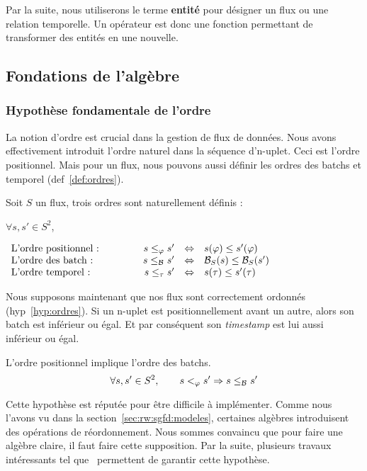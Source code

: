 Par la suite, nous utiliserons le terme \textbf{entité} pour désigner un flux ou une relation temporelle. Un opérateur est donc une fonction permettant de transformer des entités en une nouvelle.

\subsection{Fondations de l'algèbre}
\subsubsection{Hypothèse fondamentale de l'ordre}
La notion d'ordre est crucial dans la gestion de flux de données. Nous avons effectivement introduit l'ordre naturel dans la séquence d'n-uplet. Ceci est l'ordre positionnel. Mais pour un flux, nous pouvons aussi définir les ordres des batchs et temporel (def~\ref{def:ordres}).
\begin{defi}\label{def:ordres}
Soit $S$ un flux, trois ordres sont naturellement définis :

$\forall s,s' \in S^2$,

$\begin{array}{lcrcl} 
\textrm{L'ordre positionnel : } &\qquad & s \leq_\varphi s' & \Leftrightarrow & s(\varphi) \leq s'(\varphi)\\
\textrm{L'ordre des batch : } & & s \leq_{\mathcal{B}_{}} s' &\Leftrightarrow& \mathcal{B}_S(s) \leq \mathcal{B}_S(s')\\
\textrm{L'ordre temporel : } & & s \leq_\tau s' &\Leftrightarrow& s(\tau) \leq s'(\tau)\\
\end{array}$
\end{defi}

Nous supposons maintenant que nos flux sont correctement ordonnés (hyp~\ref{hyp:ordres}). Si un n-uplet est positionnellement avant un autre, alors son batch est inférieur ou égal. Et par conséquent son \textit{timestamp} est lui aussi inférieur ou égal.
\begin{hyp}\label{hyp:ordres}
L'ordre positionnel implique l'ordre des batchs.
$$\forall s, s'\in S^2, \qquad s <_\varphi s' \Rightarrow s \leq_{\mathcal{B}_{}} s'$$
\end{hyp}
Cette hypothèse est réputée pour être difficile à implémenter. Comme nous l'avons vu dans la section~\ref{sec:rw:sgfd:modeles}, certaines algèbres introduisent des opérations de réordonnement. Nous sommes convaincu que pour faire une algèbre claire, il faut faire cette supposition. Par la suite, plusieurs travaux intéressants tel que~\cite{Krishnamurthy:discontinuous} permettent de garantir cette hypothèse.


